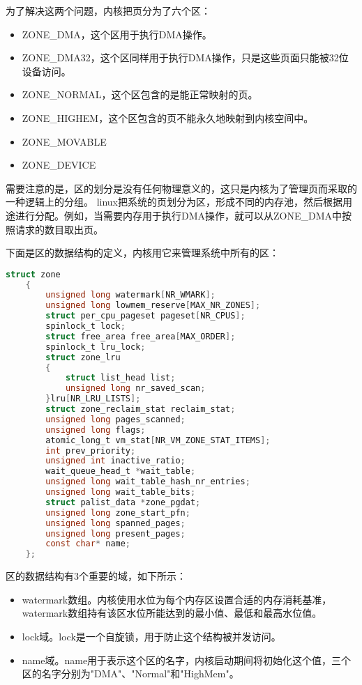 \documentclass[a4paper,left=2.5cm,right=2.5cm,11pt]{article}
\begin{document}
	为了解决这两个问题，内核把页分为了六个区：
	\begin{itemize}
		\item ZONE\_DMA，这个区用于执行DMA操作。
		\item ZONE\_DMA32，这个区同样用于执行DMA操作，只是这些页面只能被32位设备访问。
		\item ZONE\_NORMAL，这个区包含的是能正常映射的页。
		\item ZONE\_HIGHEM，这个区包含的页不能永久地映射到内核空间中。
		\item ZONE\_MOVABLE
		\item ZONE\_DEVICE
	\end{itemize}

	需要注意的是，区的划分是没有任何物理意义的，这只是内核为了管理页而采取的一种逻辑上的分组。
	linux把系统的页划分为区，形成不同的内存池，然后根据用途进行分配。例如，当需要内存用于执行DMA操作，就可以从ZONE\_DMA中按照请求的数目取出页。\par

	下面是区的数据结构的定义，内核用它来管理系统中所有的区：
	\begin{lstlisting}[language = C]
	struct zone
	{
		unsigned long watermark[NR_WMARK];
		unsigned long lowmem_reserve[MAX_NR_ZONES];
		struct per_cpu_pageset pageset[NR_CPUS];
		spinlock_t lock;
		struct free_area free_area[MAX_ORDER];
		spinlock_t lru_lock;
		struct zone_lru
		{
			struct list_head list;
			unsigned long nr_saved_scan;
		}lru[NR_LRU_LISTS];
		struct zone_reclaim_stat reclaim_stat;
		unsigned long pages_scanned;
		unsigned long flags;
		atomic_long_t vm_stat[NR_VM_ZONE_STAT_ITEMS];
		int prev_priority;
		unsigned int inactive_ratio;
		wait_queue_head_t *wait_table;
		unsigned long wait_table_hash_nr_entries;
		unsigned long wait_table_bits;
		struct palist_data *zone_pgdat;
		unsigned long zone_start_pfn;
		unsigned long spanned_pages;
		unsigned long present_pages;
		const char* name;
	};
	\end{lstlisting}

	区的数据结构有3个重要的域，如下所示：
	\begin{itemize}
		\item watermark数组。内核使用水位为每个内存区设置合适的内存消耗基准，watermark数组持有该区水位所能达到的最小值、最低和最高水位值。
		\item lock域。lock是一个自旋锁，用于防止这个结构被并发访问。
		\item name域。name用于表示这个区的名字，内核启动期间将初始化这个值，三个区的名字分别为"DMA"、"Normal"和"HighMem"。
	\end{itemize}
\end{document}
